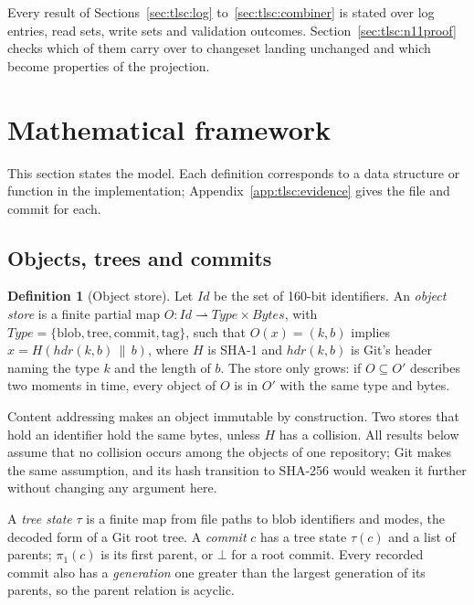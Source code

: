 \documentclass[11pt,letterpaper]{article}
\theoremstyle{definition}
\newtheorem{definition}[theorem]{Definition}
\theoremstyle{remark}
\newcommand{\tree}{\tau}
\newcommand{\fp}{\pi_1}
\begin{document}
Every result of Sections~\ref{sec:tlsc:log} to~\ref{sec:tlsc:combiner} is stated over log entries, read sets, write sets and validation outcomes. Section~\ref{sec:tlsc:n11proof} checks which of them carry over to changeset landing unchanged and which become properties of the projection.

\section{Mathematical framework}
\label{sec:tlsc:framework}

This section states the model. Each definition corresponds to a data structure or function in the implementation; Appendix~\ref{app:tlsc:evidence} gives the file and commit for each.

\subsection{Objects, trees and commits}

\begin{definition}[Object store]
\label{def:tlsc:objects}
Let $\mathit{Id}$ be the set of 160-bit identifiers. An \emph{object store} is a finite partial map $O:\mathit{Id}\rightharpoonup\mathit{Type}\times\mathit{Bytes}$, with $\mathit{Type}=\{\mathrm{blob},\mathrm{tree},\mathrm{commit},\mathrm{tag}\}$, such that $O(x)=(k,b)$ implies $x=H(\mathit{hdr}(k,b)\,\|\,b)$, where $H$ is SHA-1 and $\mathit{hdr}(k,b)$ is Git's header naming the type $k$ and the length of $b$. The store only grows: if $O\subseteq O'$ describes two moments in time, every object of $O$ is in $O'$ with the same type and bytes.
\end{definition}

Content addressing makes an object immutable by construction. Two stores that hold an identifier hold the same bytes, unless $H$ has a collision. All results below assume that no collision occurs among the objects of one repository; Git makes the same assumption, and its hash transition to SHA-256 would weaken it further without changing any argument here.

A \emph{tree state} $\tree$ is a finite map from file paths to blob identifiers and modes, the decoded form of a Git root tree. A \emph{commit} $c$ has a tree state $\tree(c)$ and a list of parents; $\fp(c)$ is its first parent, or $\bot$ for a root commit. Every recorded commit also has a \emph{generation} one greater than the largest generation of its parents, so the parent relation is acyclic.
\end{document}
